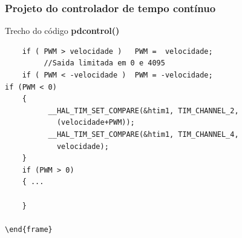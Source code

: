 \begin{frame}[fragile] %
\frametitle{Projeto do controlador de tempo contínuo}
\begin{block}{Trecho do código \textbf{pdcontrol()}}


\begin{verbatim}
	if ( PWM > velocidade )   PWM =  velocidade;
		 //Saida limitada em 0 e 4095
	if ( PWM < -velocidade )  PWM = -velocidade;
if (PWM < 0)
	{
		  __HAL_TIM_SET_COMPARE(&htim1, TIM_CHANNEL_2, 
		  	(velocidade+PWM));
		  __HAL_TIM_SET_COMPARE(&htim1, TIM_CHANNEL_4, 
		  	velocidade);
	}
	if (PWM > 0)
	{ ...

	}

\end{frame}\end{verbatim}
\end{block}
\end{frame}



